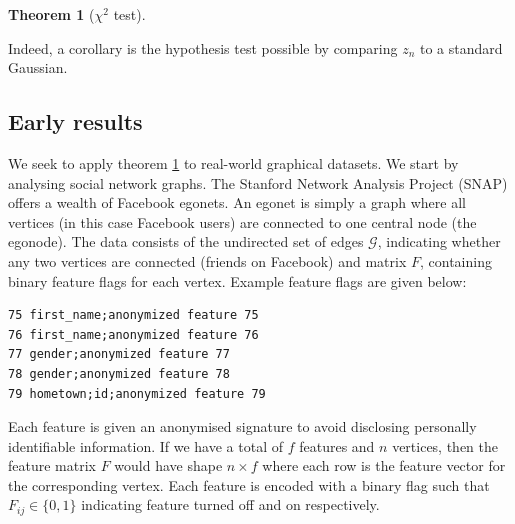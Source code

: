 \documentclass[11pt]{article}
\newcommand{\Gcal}{\mathcal{G}}
\newtheorem{theorem}{Theorem}[section]
\begin{document}
\begin{multicols*}{2}
\begin{theorem}[$\chi^2$ test]
	\label{theorem:hyp-test-sbm-chi}
\end{theorem}

Indeed, a corollary is the hypothesis test possible by comparing $z_n$ to a standard Gaussian.

\subsection{Early results}

We seek to apply theorem \ref{theorem:hyp-test-sbm-chi} to real-world graphical datasets. We start by analysing social network graphs. The Stanford Network Analysis Project (SNAP) \cite{snapnets} offers a wealth of Facebook egonets. An egonet is simply a graph where all vertices (in this case Facebook users) are connected to one central node (the egonode). The data consists of the undirected set of edges $\Gcal$, indicating whether any two vertices are connected (friends on Facebook) and matrix $F$, containing binary feature flags for each vertex. Example feature flags are given below: \\

\begin{center}
\begin{minipage}{8cm}
\begin{Verbatim}[fontsize=\small, frame=single, label={\fbox{Example anonymised feature flags}}]
75 first_name;anonymized feature 75
76 first_name;anonymized feature 76
77 gender;anonymized feature 77
78 gender;anonymized feature 78
79 hometown;id;anonymized feature 79
\end{Verbatim}
\end{minipage}
\end{center}


Each feature is given an anonymised signature to avoid disclosing personally identifiable information. If we have a total of $f$ features and $n$ vertices, then the feature matrix $F$ would have shape $n \times f$ where each row is the feature vector for the corresponding vertex. Each feature is encoded with a binary flag such that $F_{ij} \in \{0, 1\}$ indicating feature turned off and on respectively.


\end{multicols*}
\end{document}
